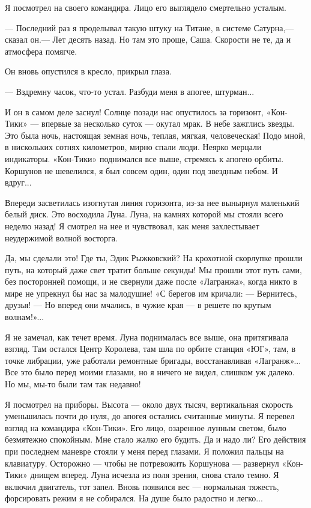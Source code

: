 \documentclass[11pt,a4paper,oneside]{article}
\begin{document}
Я посмотрел на своего командира. Лицо его выглядело смертельно усталым.

— Последний раз я проделывал такую штуку на Титане, в системе Сатурна,— сказал он.— Лет десять назад. Но там это проще, Саша. Скорости не те, да и атмосфера помягче.

Он вновь опустился в кресло, прикрыл глаза.

— Вздремну часок, что-то устал. Разбуди меня в апогее, штурман...

И он в самом деле заснул! Солнце позади нас опустилось за горизонт, «Кон-Тики» — впервые за несколько суток — окутал мрак. В небе зажглись звезды. Это была ночь, настоящая земная ночь, теплая, мягкая, человеческая! Подо мной, в нискольких сотнях километров, мирно спали люди. Неярко мерцали индикаторы. «Кон-Тики» поднимался все выше, стремясь к апогею орбиты. Коршунов не шевелился, я был совсем один, один под звездным небом. И вдруг...

Впереди засветилась изогнутая линия горизонта, из-за нее вынырнул маленький белый диск. Это восходила Луна. Луна, на камнях которой мы стояли всего неделю назад! Я смотрел на нее и чувствовал, как меня захлестывает неудержимой волной восторга.

Да, мы сделали это! Где ты, Эдик Рыжковский? На крохотной скорлупке прошли путь, на который даже свет тратит больше секунды! Мы прошли этот путь сами, без посторонней помощи, и не свернули даже после «Лагранжа», когда никто в мире не упрекнул бы нас за малодушие! «С берегов им кричали: — Вернитесь, друзья! — Но вперед они мчались, в чужие края — в решете по крутым волнам!»...

Я не замечал, как течет время. Луна поднималась все выше, она притягивала взгляд. Там остался Центр Королева, там шла по орбите станция «ЮГ», там, в точке либрации, уже работали ремонтные бригады, восстанавливая «Лагранж»... Все это было перед моими глазами, но я ничего не видел, слишком уж далеко. Но мы, мы-то были там так недавно!

Я посмотрел на приборы. Высота — около двух тысяч, вертикальная скорость уменьшилась почти до нуля, до апогея остались считанные минуты. Я перевел взгляд на командира «Кон-Тики». Его лицо, озаренное лунным светом, было безмятежно спокойным. Мне стало жалко его будить. Да и надо ли? Его действия при последнем маневре стояли у меня перед глазами. Я положил пальцы на клавиатуру. Осторожно — чтобы не потревожить Коршунова — развернул «Кон-Тики» днищем вперед. Луна исчезла из поля зрения, снова стало темно. Я включил двигатель, тот запел. Вновь появился вес — нормальная тяжесть, форсировать режим я не собирался. На душе было радостно и легко...
\end{document}
